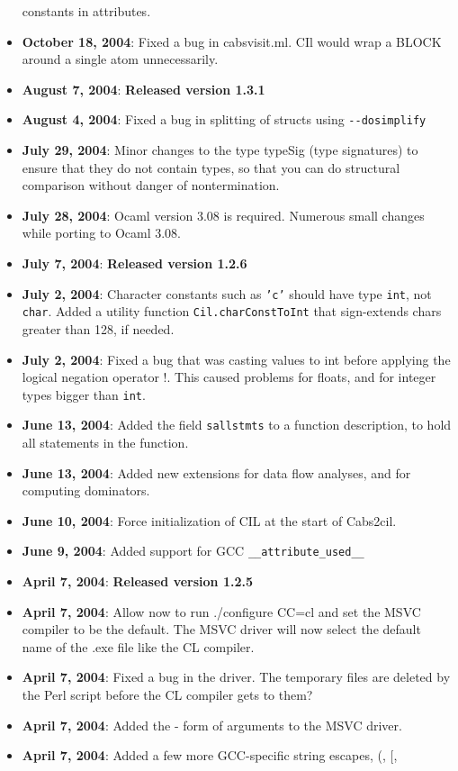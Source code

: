 \documentclass[letterpaper]{article}
\def\t#1{{\tt #1}}
\begin{document}
\begin{itemize}
  constants in attributes.
\item {\bf October 18, 2004}: Fixed a bug in cabsvisit.ml. CIl would wrap a
  BLOCK around a single atom unnecessarily. 
\item {\bf August 7, 2004}: {\bf Released version 1.3.1}
\item {\bf August 4, 2004}: Fixed a bug in splitting of structs using 
  \t{-{}-dosimplify}
\item {\bf July 29, 2004}: Minor changes to the type typeSig (type signatures)
  to ensure that they do not contain types, so that you can do structural
  comparison without danger of nontermination. 
\item {\bf July 28, 2004}: Ocaml version 3.08 is required. Numerous small 
  changes while porting to Ocaml 3.08. 
\item {\bf July 7, 2004}: {\bf Released version 1.2.6}
\item {\bf July 2, 2004}:  Character constants such as \t{'c'} should
  have type \t{int}, not \t{char}.  Added a utility function
  \t{Cil.charConstToInt} that sign-extends chars greater than 128, if needed.
\item {\bf July 2, 2004}: Fixed a bug that was casting values to int
  before applying the logical negation operator !.  This caused
  problems for floats, and for integer types bigger than \t{int}.
\item {\bf June 13, 2004}: Added the field \t{sallstmts} to a function
  description, to hold all statements in the function.
\item {\bf June 13, 2004}: Added new extensions for data flow analyses, and
  for computing dominators.
\item {\bf June 10, 2004}: Force initialization of CIL at the start of
Cabs2cil. 
\item {\bf June 9, 2004}: Added support for GCC \t{\_\_attribute\_used\_\_}
\item {\bf April 7, 2004}: {\bf Released version 1.2.5}
\item {\bf April 7, 2004}: Allow now to run ./configure CC=cl and set the MSVC
compiler to be the default. The MSVC driver will now select the default name
of the .exe file like the CL compiler. 
\item {\bf April 7, 2004}: Fixed a bug in the driver. The temporary files are
deleted by the Perl script before the CL compiler gets to them?
\item {\bf April 7, 2004}: Added the - form of arguments to the MSVC driver.
\item {\bf April 7, 2004}: Added a few more GCC-specific string escapes, (, [,

\end{itemize}
\end{document}
